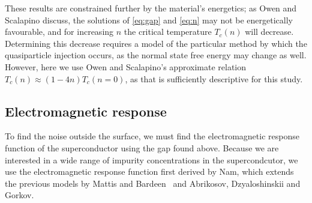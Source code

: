 \documentclass[%
 preprint,
 amsmath,amssymb,
 aps,
]{revtex4-2}
\begin{document}
These results are constrained further by the material's energetics;
as Owen and Scalapino discuss, the solutions of \eqref{eq:gap} and \eqref{eq:n} may not be energetically favourable, and for increasing $n$ the critical temperature $T_c(n)$ will decrease.\cite{OwenScalapino}
Determining this decrease requires a model of the particular method by which the quasiparticle injection occurs, as the normal state free energy may change as well.
However, here we use Owen and Scalapino's approximate relation $T_c(n) \approx (1 - 4n) T_c(n = 0)$, as that is sufficiently descriptive for this study.

\subsection{Electromagnetic response}
To find the noise outside the surface, we must find the electromagnetic response function of the superconductor using the gap found above.
Because we are interested in a wide range of impurity concentrations in the supercondcutor, we use the electromagnetic response function first derived by Nam\cite{Nam1967}, which extends the previous models by Mattis and Bardeen~\cite{Mattis} and Abrikosov, Dzyaloshinskii and Gorkov\cite{AGD}.
\end{document}
